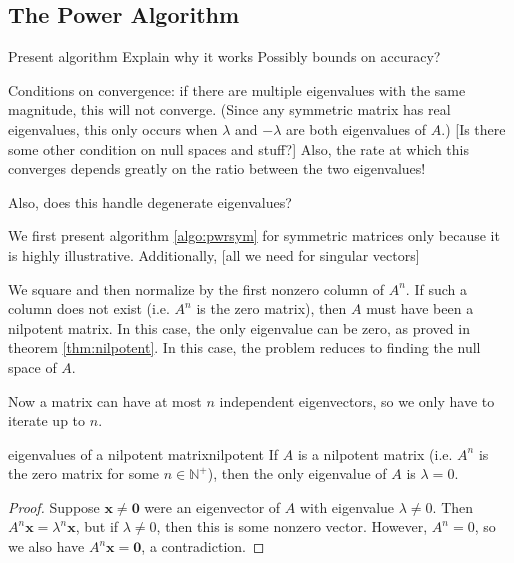 \documentclass{article}
\let\vec\mathbf
\begin{document}
\subsection{The Power Algorithm}
Present algorithm
Explain why it works
Possibly bounds on accuracy?

Conditions on convergence: if there are multiple eigenvalues with the same magnitude, this will not converge. (Since any symmetric matrix has real eigenvalues, this only occurs when $\lambda$ and $-\lambda$ are both eigenvalues of $A$.) [Is there some other condition on null spaces and stuff?] Also, the rate at which this converges depends greatly on the ratio between the two eigenvalues!

Also, does this handle degenerate eigenvalues?

We first present algorithm \ref{algo:pwrsym} for symmetric matrices only because it is highly illustrative. Additionally, [all we need for singular vectors]

We square and then normalize by the first nonzero column of $A^n$. If such a column does not exist (i.e. $A^n$ is the zero matrix), then $A$ must have been a nilpotent matrix. In this case, the only eigenvalue can be zero, as proved in theorem \ref{thm:nilpotent}. In this case, the problem reduces to finding the null space of $A$.

Now a matrix can have at most $n$ independent eigenvectors, so we only have to iterate up to $n$.

\begin{theorem}{eigenvalues of a nilpotent matrix}{nilpotent}
  If $A$ is a nilpotent matrix (i.e. $A^n$ is the zero matrix for some $n \in \mathbb{N}^+$), then the only eigenvalue of $A$ is $\lambda = 0$.
  \begin{proof}
    Suppose $\vec{x} \neq \vec{0}$ were an eigenvector of $A$ with eigenvalue $\lambda \neq 0$. Then $A^n\vec{x} = \lambda^n\vec{x}$, but if $\lambda \neq 0$, then this is some nonzero vector. However, $A^n = 0$, so we also have $A^n\vec{x} = \vec{0}$, a contradiction.
  \end{proof}
\end{theorem}
\end{document}
